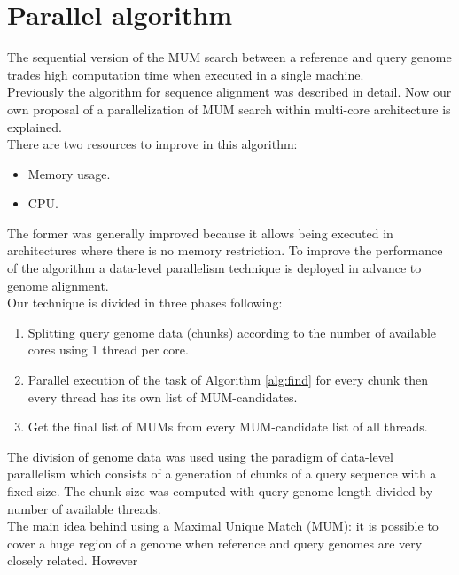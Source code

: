 \documentclass[3p,times]{elsarticle}
\begin{document}
\section{Parallel algorithm}  
The sequential version of the MUM search between a reference and query genome trades high computation time when executed in a single machine. \\
Previously the algorithm for sequence alignment was described in detail. Now our own proposal of a parallelization of MUM search within multi-core architecture is explained.\\
There are two resources to improve in this algorithm:
\begin{itemize}
\item Memory usage.
\item CPU.
\end{itemize}
The former was generally improved because it allows being executed in architectures where there is no memory restriction. To improve the performance of the algorithm a data-level parallelism technique is deployed in advance to genome alignment.\\
Our technique is divided in three phases following:
\begin{enumerate}
\item Splitting query genome data (chunks) according to the number of available cores using 1 thread per core.
\item Parallel execution of the task of Algorithm \ref{alg:find} for every chunk then every thread has its own list of MUM-candidates.
\item Get the final list of MUMs from every MUM-candidate list of all threads.
\end{enumerate}
The division of genome data was used using the paradigm of data-level parallelism which consists of a generation of chunks of a query sequence with a fixed size. The chunk size was computed with query genome length divided by number of available threads.\\
The main idea behind using a Maximal Unique Match (MUM): it is possible to cover a huge region of a genome when reference and query genomes are very closely related. However 
\end{document}
